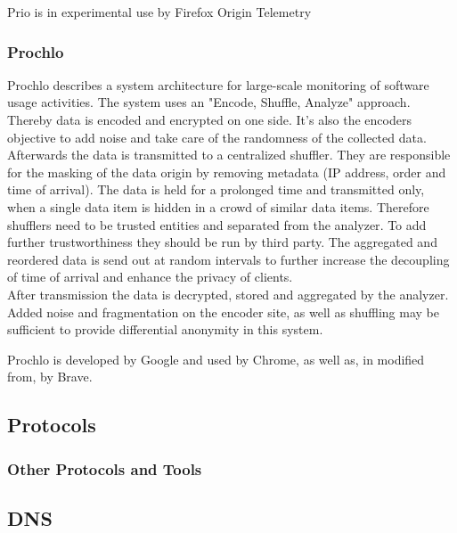     Prio is in experimental use by Firefox Origin Telemetry\\

\subsubsection{Prochlo}
    Prochlo describes a system architecture for large-scale monitoring of software usage activities. The system uses an "Encode, Shuffle, Analyze" approach. Thereby data is encoded and encrypted on one side. It's also the encoders objective to add noise and take care of the randomness of the collected data\cite{bittau_prochlo_2017}.\\
    Afterwards the data is transmitted to a centralized shuffler. They are responsible for the masking of the data origin by removing metadata (IP address, order and time of arrival).
    The data is held for a prolonged time and transmitted only, when a single data item is hidden in a crowd of similar data items. Therefore shufflers need to be trusted entities and separated from the analyzer\cite{bittau_prochlo_2017}. To add further trustworthiness they should be run by third party. The aggregated and reordered data is send out at random intervals to further increase the decoupling of time of arrival and enhance the privacy of clients.\\
    After transmission the data is decrypted, stored and aggregated by the analyzer. 
    Added noise and fragmentation on the encoder site, as well as shuffling may be sufficient to provide differential anonymity in this system.
    
    Prochlo is developed by Google and used by Chrome, as well as, in modified from, by Brave.

%
%
\subsection{Protocols}
\label{subsec:related:protocols}
%

\subsubsection{Other Protocols and Tools}


\subsection{DNS}



